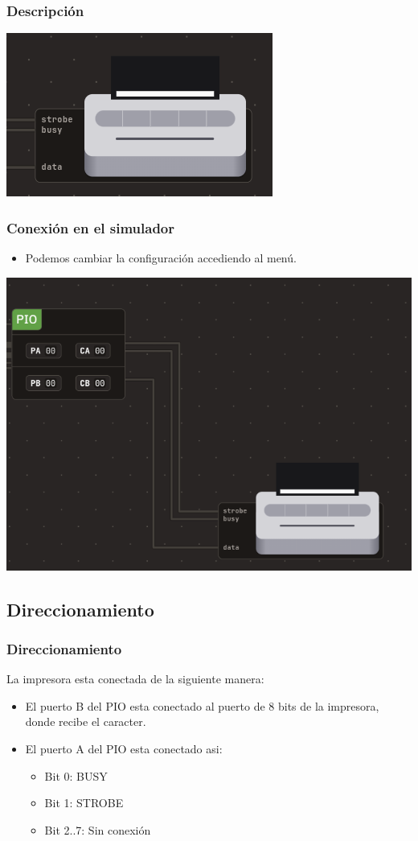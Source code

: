 \documentclass{beamer}
\begin{document}
\begin{frame}
\frametitle{Descripción}
\begin{center}
 \includegraphics[scale=0.75]{impresora_vonsim.png}
\end{center}
\end{frame}


\begin{frame}
\frametitle{Conexión en el simulador}
  \begin{itemize}
  \item Podemos cambiar la configuración accediendo al menú.
\end{itemize}
\begin{center}
 \includegraphics[scale=0.45]{pio1_vonsim.png}
\end{center}
\end{frame}

\subsection{Direccionamiento}
\begin{frame}
\frametitle{Direccionamiento}
La impresora esta conectada de la siguiente manera:
\begin{itemize}
    \item El puerto B del PIO esta conectado al puerto de 8 bits de la impresora, donde recibe el caracter.
    \item El puerto A del PIO esta conectado asi:
\begin{itemize}
    \item Bit 0: BUSY
    \item Bit 1: STROBE
    \item Bit 2..7: Sin conexión
\end{itemize}
\end{itemize}
\end{frame}
\end{document}
